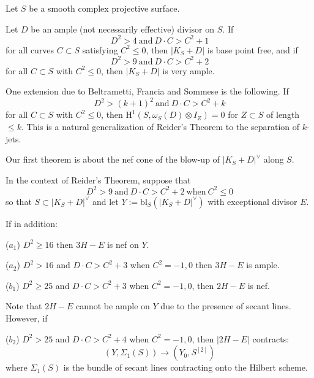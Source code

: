 \documentclass{amsart}
\begin{document}
\medskip

Let $S$ be a smooth complex projective surface. 

\medskip

  Let $D$ be an ample (not necessarily effective) divisor on $S$. If 
\[ D^2 > 4 \ \mbox{and} \ D \cdot C > C^2 + 1 \]
for all curves $C \subset S$ satisfying $C^2 \le 0$, then $|K_S + D|$ is base point free, and if
\[ D^2 > 9 \ \mbox{and} \ D \cdot C > C^2 + 2 \]
for all $C \subset S$ with $C^2 \le 0$, then $|K_S + D|$ is very ample. 

\medskip

One extension due to Beltrametti, Francia and Sommese \cite{BFS}  is the following. If
\[ D^2 > (k+1)^2 \ \mbox{and} \ D \cdot C > C^2 + k \] 
for all $C \subset S$ with $C^2 \le 0$, then $\mbox{H}^1(S, \omega_S(D) \otimes I_Z) = 0$ for $Z \subset S$ of length $\le k$. 
This is a natural generalization of Reider's Theorem to the separation of $k$-jets. 

\medskip

Our first theorem is about the nef cone of the blow-up of $|K_S + D|^\vee$ along $S$.  

\medskip

 In the context of Reider's Theorem, suppose that 
\[ D^2 > 9 \ \mbox{and} \ D \cdot C > C^2 + 2 \ \mbox{when} \ C^2 \le 0 \] 
so that $S \subset |K_S + D|^\vee$ and let
$Y := \mbox{bl}_S(|K_S + D|^\vee)$ with exceptional divisor $E$.

\medskip

If in addition: 

\medskip

($a_1$) $D^2 \ge 16$ then $3H - E$ is nef on $Y$. 

\medskip

($a_2$) $D^2 > 16$ and $D \cdot C > C^2 + 3$ when $C^2 = -1,0$ then $3H - E$ is ample.  

\medskip

($b_1$) $D^2 \ge 25$ and $D\cdot C > C^2 + 3$ when $C^2 = -1,0$, then $2H - E$ is nef. 

\medskip

Note that $2H - E$ cannot be ample on $Y$ due to the presence of secant lines. However, if

\medskip

($b_2$) $D^2 > 25$ and $D \cdot C > C^2 + 4$ when $C^2= -1,0$, then $|2H - E|$ contracts: 
\[ (Y, \Sigma_1(S)) \rightarrow (Y_0, S^{[2]}) \] 
where $\Sigma_1(S)$ is the bundle of secant lines contracting onto the Hilbert scheme. 
\end{document}
